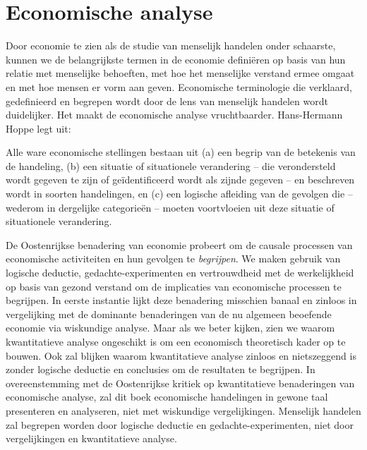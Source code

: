 \vspace{-1em}
\section{Economische analyse}

Door economie te zien als de studie van menselijk handelen onder schaarste, kunnen we de belangrijkste termen in de economie definiëren op basis van hun relatie met menselijke behoeften, met hoe het menselijke verstand ermee omgaat en met hoe mensen er vorm aan geven. Economische terminologie die verklaard, gedefinieerd en begrepen wordt door de lens van menselijk handelen wordt duidelijker. Het maakt de economische analyse vruchtbaarder. Hans-Hermann Hoppe legt uit:

\begin{blockquotebox}
Alle ware economische stellingen bestaan uit (a) een begrip van de betekenis van de handeling, (b) een situatie of situationele verandering – die verondersteld wordt gegeven te zijn of geïdentificeerd wordt als zijnde gegeven – en beschreven wordt in soorten handelingen, en (c) een logische afleiding van de gevolgen die – wederom in dergelijke categorieën – moeten voortvloeien uit deze situatie of situationele verandering.\footnotemark 
\end{blockquotebox}\autocite{7}

De Oostenrijkse benadering van economie probeert om de causale processen van economische activiteiten en hun gevolgen te \textit{begrijpen}. We maken gebruik van logische deductie, gedachte-experimenten en vertrouwdheid met de werkelijkheid op basis van gezond verstand om de implicaties van economische processen te begrijpen. In eerste instantie lijkt deze benadering misschien banaal en zinloos in vergelijking met de dominante benaderingen van de nu algemeen beoefende economie via wiskundige analyse. Maar als we beter kijken, zien we waarom kwantitatieve analyse ongeschikt is om een economisch theoretisch kader op te bouwen. Ook zal blijken waarom kwantitatieve analyse zinloos en nietszeggend is zonder logische deductie en conclusies om de resultaten te begrijpen. In overeenstemming met de Oostenrijkse kritiek op kwantitatieve benaderingen van economische analyse, zal dit boek economische handelingen in gewone taal presenteren en analyseren, niet met wiskundige vergelijkingen. Menselijk handelen zal begrepen worden door logische deductie en gedachte-experimenten, niet door vergelijkingen en kwantitatieve analyse.

